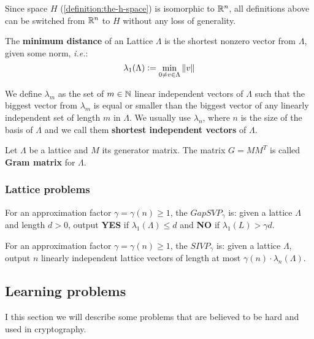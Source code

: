 \documentclass[a4paper,12pt]{article}
\begin{document}
Since space \(H\) (\ref{definition:the-h-space}) is isomorphic to \(\mathbb{R}^n\), all definitions above can be switched from \(\mathbb{R}^n\) to \(H\) without any loss of generality.

\begin{definition}
  The \textbf{minimum distance} of an Lattice $\Lambda$ is the shortest nonzero vector
  from $\Lambda$, given some norm, \textit{i.e.}:
  $$
  \lambda_1(\Lambda) \vcentcolon = \min_{0 \ne v \in \Lambda}{\|v\|}
  $$

  We define $\lambda_m$ as the set of $m \in \mathbb{N}$  linear independent vectors of $\Lambda$
  such that the biggest vector from $\lambda_m$ is equal or smaller than the biggest vector of any linearly independent set of length $m$ in $\Lambda$. We usually use
  $\lambda_n$, where $n$ is the size of the basis of $\Lambda$ and we call them
  \textbf{shortest independent vectors} of $\Lambda$.
\end{definition}

\begin{definition}\label{definition:gram-matrix}
  Let $\Lambda$ be a lattice and $M$ its generator matrix. The matrix $G = MM^T$ is called \textbf{Gram matrix} for $\Lambda$.
\end{definition}
\subsubsection{Lattice problems}
\label{sec:org94dfa9a}
\begin{definition}
  \label{definition:GapSVP-gap-shortest-vector-problem}
For an approximation factor $\gamma  = \gamma(n) \geq 1$, the $GapSVP_\gamma $ is: given a lattice
$\Lambda$ and length $d > 0$, output \textbf{YES} if $\lambda_1(\Lambda) \leq d$ and \textbf{NO} if
$\lambda_1(L) > \gamma d$.  
\end{definition}

\begin{definition}
  \label{definition:SIVP-shortest-independent-vector-problem}
  For an approximation factor $\gamma = \gamma(n) \geq 1$, the $SIVP_\gamma$ is: given a lattice $\Lambda$, output $n$ linearly independent lattice vectors of length at most $\gamma(n) \cdot \lambda_n(\Lambda)$.
\end{definition}

\subsection{Learning problems}
\label{sec:orgc40e2ac}
I this section we will describe some problems that are believed to be hard and used in cryptography. 
\end{document}
